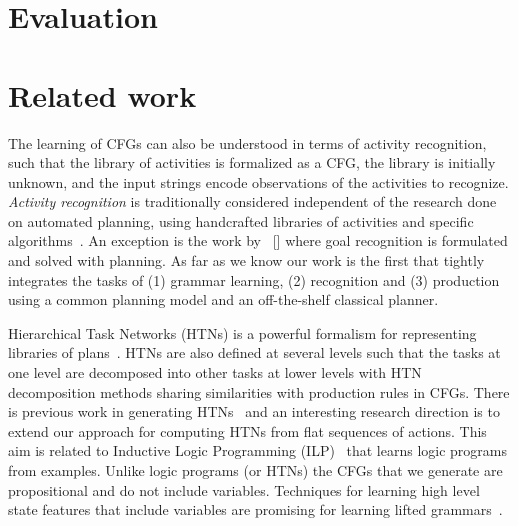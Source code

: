 \documentclass[letterpaper]{article} %
\begin{document}
\section{Evaluation}


\section{Related work}

The learning of CFGs can also be understood in terms of activity recognition, such that the library of activities is formalized as a CFG, the library is initially unknown, and the input strings encode observations of the activities to recognize. {\it Activity recognition} is traditionally considered independent of the research done on automated planning, using handcrafted libraries of activities and specific algorithms~\cite{ravi2005activity}. An exception is the work by \citeauthor{ramirez2009plan}~[\citeyear{ramirez2009plan,ramirez2010probabilistic}] where goal recognition is formulated and solved with planning. As far as we know our work is the first that tightly integrates the tasks of (1) grammar learning, (2) recognition and (3) production using a common planning model and an off-the-shelf classical planner. 

Hierarchical Task Networks (HTNs) is a powerful formalism for representing libraries of plans~\cite{nau2003shop2}. HTNs are also defined at several levels such that the tasks at one level are decomposed into other tasks at lower levels with HTN decomposition methods sharing similarities with production rules in CFGs. There is previous work in generating HTNs~\cite{hogg2008htn,conf:ecai:Lotinac16} and an interesting research direction is to extend our approach for computing HTNs from flat sequences of actions. This aim is related to Inductive Logic Programming (ILP)~\cite{muggleton1999inductive} that learns logic programs from examples. Unlike logic programs (or HTNs) the CFGs that we generate are propositional and do not include variables. Techniques for learning high level state features that include variables are promising for learning lifted grammars~\cite{damir-derived-ijcai16}.
\end{document}
